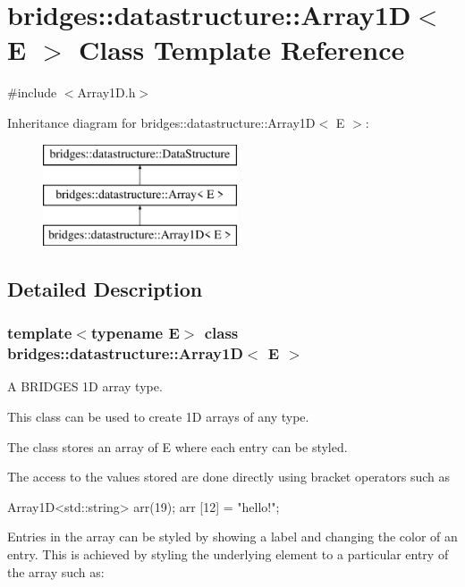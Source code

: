 \hypertarget{classbridges_1_1datastructure_1_1_array1_d}{}\section{bridges\+:\+:datastructure\+:\+:Array1D$<$ E $>$ Class Template Reference}
\label{classbridges_1_1datastructure_1_1_array1_d}


{\ttfamily \#include $<$Array1\+D.\+h$>$}

Inheritance diagram for bridges\+:\+:datastructure\+:\+:Array1D$<$ E $>$\+:\begin{figure}[H]
\begin{center}
\leavevmode
\includegraphics[height=3.000000cm]{classbridges_1_1datastructure_1_1_array1_d}
\end{center}
\end{figure}


\subsection{Detailed Description}
\subsubsection*{template$<$typename E$>$\newline
class bridges\+::datastructure\+::\+Array1\+D$<$ E $>$}

A B\+R\+I\+D\+G\+ES 1D array type. 

This class can be used to create 1D arrays of any type.

The class stores an array of E where each entry can be styled.

The access to the values stored are done directly using bracket operators such as


\begin{DoxyCode}
Array1D<std::string> arr(19);
arr [12] = \textcolor{stringliteral}{"hello!"};
\end{DoxyCode}


Entries in the array can be styled by showing a label and changing the color of an entry. This is achieved by styling the underlying element to a particular entry of the array such as\+:



